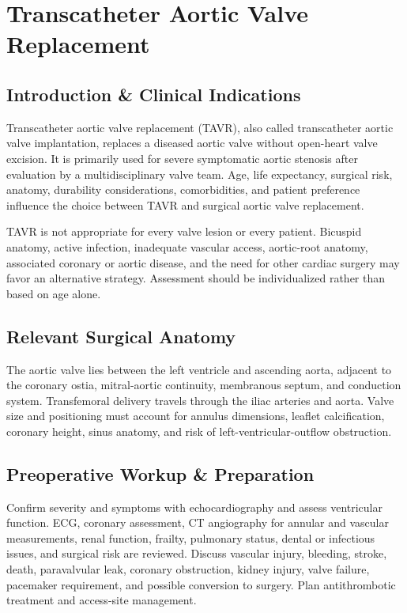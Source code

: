 \chapter{Transcatheter Aortic Valve Replacement}

\section*{Introduction \& Clinical Indications}
Transcatheter aortic valve replacement (TAVR), also called transcatheter aortic valve implantation, replaces a diseased aortic valve without open-heart valve excision. It is primarily used for severe symptomatic aortic stenosis after evaluation by a multidisciplinary valve team. Age, life expectancy, surgical risk, anatomy, durability considerations, comorbidities, and patient preference influence the choice between TAVR and surgical aortic valve replacement.

TAVR is not appropriate for every valve lesion or every patient. Bicuspid anatomy, active infection, inadequate vascular access, aortic-root anatomy, associated coronary or aortic disease, and the need for other cardiac surgery may favor an alternative strategy. Assessment should be individualized rather than based on age alone.

\section*{Relevant Surgical Anatomy}
The aortic valve lies between the left ventricle and ascending aorta, adjacent to the coronary ostia, mitral-aortic continuity, membranous septum, and conduction system. Transfemoral delivery travels through the iliac arteries and aorta. Valve size and positioning must account for annulus dimensions, leaflet calcification, coronary height, sinus anatomy, and risk of left-ventricular-outflow obstruction.

\section*{Preoperative Workup \& Preparation}
Confirm severity and symptoms with echocardiography and assess ventricular function. ECG, coronary assessment, CT angiography for annular and vascular measurements, renal function, frailty, pulmonary status, dental or infectious issues, and surgical risk are reviewed. Discuss vascular injury, bleeding, stroke, death, paravalvular leak, coronary obstruction, kidney injury, valve failure, pacemaker requirement, and possible conversion to surgery. Plan antithrombotic treatment and access-site management.


